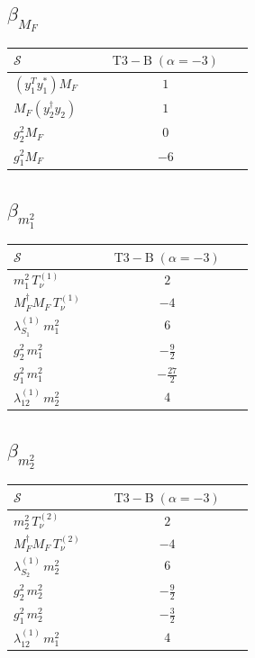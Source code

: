 \documentclass[9pt]{article}
\begin{document}
\subsection*{$ \beta_{M_F} $}
\begin{longtable}{@{}p{0.31\linewidth}c@{}}
\toprule
$\mathcal{S}$ & $ \mathrm{T3-B}\;(\alpha=-3) $ \\
\midrule
$ (y_1^T y_1^*)M_F $ & $ 1 $ \\
$ M_F(y_2^\dagger y_2) $ & $ 1 $ \\
$ g_2^2M_F $ & $ 0 $ \\
$ g_1^2M_F $ & $ -6 $ \\
\bottomrule
\end{longtable}
\subsection*{$ \beta_{m_1^{2}} $}
\begin{longtable}{@{}p{0.31\linewidth}c@{}}
\toprule
$\mathcal{S}$ & $ \mathrm{T3-B}\;(\alpha=-3) $ \\
\midrule
$ m_1^{2}\,T_{\nu}^{(1)} $ & $ 2 $ \\
$ M_F^\dagger M_F\,T_{\nu}^{(1)} $ & $ -4 $ \\
$ \lambda_{S_1}^{(1)}\,m_1^{2} $ & $ 6 $ \\
$ g_2^2\,m_1^{2} $ & $ - \frac{9}{2} $ \\
$ g_1^2\,m_1^{2} $ & $ - \frac{27}{2} $ \\
$ \lambda_{12}^{(1)}\,m_2^{2} $ & $ 4 $ \\
\bottomrule
\end{longtable}
\subsection*{$ \beta_{m_2^{2}} $}
\begin{longtable}{@{}p{0.31\linewidth}c@{}}
\toprule
$\mathcal{S}$ & $ \mathrm{T3-B}\;(\alpha=-3) $ \\
\midrule
$ m_2^{2}\,T_{\nu}^{(2)} $ & $ 2 $ \\
$ M_F^\dagger M_F\,T_{\nu}^{(2)} $ & $ -4 $ \\
$ \lambda_{S_2}^{(1)}\,m_2^{2} $ & $ 6 $ \\
$ g_2^2\,m_2^{2} $ & $ - \frac{9}{2} $ \\
$ g_1^2\,m_2^{2} $ & $ - \frac{3}{2} $ \\
$ \lambda_{12}^{(1)}\,m_1^{2} $ & $ 4 $ \\
\bottomrule
\end{longtable}
\end{document}

